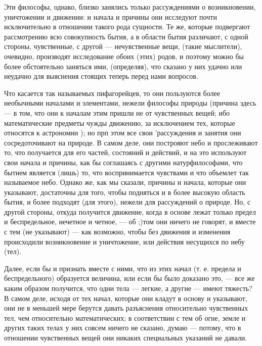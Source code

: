\documentclass{article}
\begin{document}
Эти философы, однако, близко занялись только рассуждениями о возникновении, уничтожении и движении: и начала и причины они исследуют почти исключительно в отношении такого рода сущности.
\footnotemark[5]
Те же, которые подвергают рассмотрению всю совокупность бытия, а в области бытия различают, с одной стороны, чувственные, с другой — нечувственные вещи, (такие мыслители), очевидно, производят исследование обоих (этих) родов, и поэтому можно бы более обстоятельно заняться ими, (определяя), что сказано у них удачно или неудачно для выяснения стоящих теперь перед нами вопросов.

Что касается так называемых пифагорейцев, то они пользуются более необычными началами и элементами, нежели философы природы (причина здесь — в том, что они к началам этим пришли не от чувственных вещей; ибо математические предметы чужды движению, за исключением тех, которые относятся к астрономии ); но прп этом все свои 'рассуждения и занятия они сосредоточивают на природе. В самом деле, они построяют небо и прослеживают то, что получается для его частей, состояний и действий, и на это используют свои начала и причины, как бы соглашаясь с другими натурфилософами, что бытием является (лишь) то, что воспринимается чувствами и что объемлет так называемое небо. Однако же, как мы сказали, причины и начала, которые они указывают, достаточны для того, чтобы подняться и в более высокую область бытия, и более подходят (для этого), нежели для рассуждений о природе. Но, с другой стороны, откуда получится движение, когда в основе лежат только предел и беспредельное, нечетное и четное, — об ;)том они ничего не говорят, и вместе с тем (не указывают) — как возможно, чтобы без движения и изменения происходили возникновение и уничтожение, или действия несущихся по небу (тел).

Далее, если бы и признать вместе с ними, что из этих начал (т. е. предела и беспредельного) образуется величина, или если бы было доказано это, — все же каким образом получится, что одни тела — легкие, а другие — имеют тяжесть? В самом деле, исходя от тех начал, которые они кладут в основу и указывают, они не в меньшей мере берутся давать разъяснения относительно чувственных тел, чем относительно математических; в соответствии с тем об огне, земле и других таких телах у них совсем ничего не сказано, думаю — потому, что в отношении чувственных вещей они никаких специальных указаний не давали.
\end{document}
